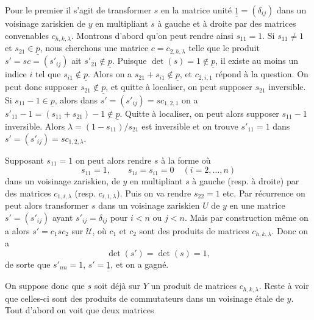 
Pour le premier il s'agit de transformer \(s\) en la matrice unité \(\underline{\underline{1}}=(\delta_{ij})\) dans un voisinage zariskien de \(y\) en multipliant \(s\) à gauche et à droite par des matrices convenables \(c_{h,k,\lambda}\). Montrons d'abord qu'on peut rendre ainsi \(s_{11}=1\). Si \(s_{11}\ne1\) et \(s_{21}\in\underline{p}\), nous cherchons une matrice \(c=c_{2,h,\lambda}\) telle que le produit \(s'=sc=(s'_{ij})\) ait \(s'_{21}\notin\underline{p}\). Puisque \(\det(s)=1\notin\underline{p}\), il existe au moins un indice \(i\) tel que \(s_{i1}\notin\underline{p}\). Alors on a \(s_{21}+s_{i1}\notin\underline{p}\), et \(c_{2,i,1}\) répond à la question. On peut donc supposer \(s_{21}\notin\underline{p}\), et quitte à localiser, on peut supposer \(s_{21}\) inversible. Si \(s_{11}-1\in\underline{p}\), alors dans \(s'=(s'_{ij})=sc_{1,2,1}\) on a
\(s'_{11}-1=(s_{11}+s_{21})-1\notin\underline{p}\). Quitte à localiser, on peut alors supposer \(s_{11}-1\) inversible. Alors \(\lambda=(1-s_{11})/s_{21}\) est inversible et on trouve \(s'_{11}=1\) dans \(s'=(s'_{ij})=sc_{1,2,\lambda}\).

Supposant \(s_{11}=1\) on peut alors rendre \(s\) à la forme où
\[
 s_{11}=1,\qquad s_{1i}=s_{i1}=0\quad(i=2,\ldots,n)
\]
dans un voisinage zariskien, de \(y\) en multipliant \(s\) à gauche (resp. à droite) par des matrices \(c_{1,i,\lambda}\) (resp. \(c_{i,1,\lambda}\)). Puis on va rendre \(s_{22}=1\) etc. Par récurrence on peut alors transformer \(s\) dans un voisinage zariskien \(U\) de \(y\) en une matrice \(s'=(s'_{ij})\) ayant \(s'_{ij}=\delta_{ij}\) pour \(i<n\) ou \(j<n\). Mais par construction même on a alors \(s'=c_1sc_2\) sur \(\mathcal U\), où \(c_1\) et \(c_2\) sont des produits de matrices \(c_{h,k,\lambda}\). Donc on a
\[
 \det(s')=\det(s)=1,
\]
de sorte que \(s'_{nn}=1\), \(s'=\underline{\underline{1}}\), et on a gagné.

On suppose donc que \(s\) soit déjà sur \(Y\) un produit de matrices \(c_{h,k,\lambda}\).
Reste à voir que celles-ci sont des produits de commutateurs dans un voisinage étale de \(y\). Tout d'abord on voit que deux matrices
